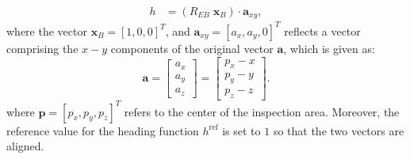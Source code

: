 \documentclass[letterpaper, 10 pt, conference]{ieeeconf}  %
\begin{document}
%
\begin{align}\label{eq:heading_function}
    h &= (R_{EB} \; \mathbf{x}_B)\cdot \mathbf{a}_{xy},
\end{align}
%
where the vector $\mathbf{x}_B = [1, 0, 0]^T$, and $\mathbf{a}_{xy} = [a_{x}, a_{y}, 0]^T$ reflects a vector comprising the $x-y$ components of the original vector $\mathbf{a}$, which is given as:
%
\begin{equation}\label{eq:a}
    \mathbf{a} = \begin{bmatrix}
           a_{x} \\
           a_{y} \\
           a_{z}  
         \end{bmatrix}
    = \begin{bmatrix}
           p_{x}-x \\
           p_{y}-y \\
           p_{z}-z  
         \end{bmatrix}.
\end{equation}
%
where $\mathbf{p} = [p_x, p_y, p_z]^T$ refers to the center of the inspection area. Moreover, the reference value for the heading function $h^\textrm{ref}$ is set to $1$ so that the two vectors are aligned.  
\end{document}
